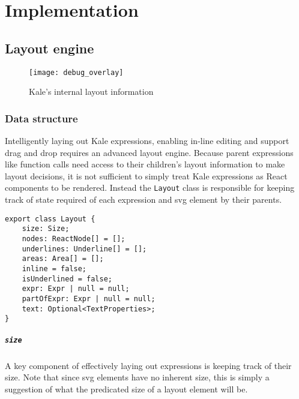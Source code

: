 \chapter{Implementation}

\section{Layout engine}

\begin{figure}[H]
\texttt{[image: debug\_overlay]}
\caption{Kale's internal layout information\protect\footnotemark}
\end{figure}

\subsection{Data structure}

Intelligently laying out Kale expressions, enabling in-line editing and
support drag and drop requires an advanced layout engine.
Because parent expressions like function calls need access to their children's
layout information to make layout decisions, it is not sufficient to simply
treat Kale expressions as React components to be rendered. Instead the
\texttt{Layout} class is responsible for keeping track of state required
of each expression and \ac{svg} element by their parents.

\begin{Verbatim}[samepage]
export class Layout {
    size: Size;
    nodes: ReactNode[] = [];
    underlines: Underline[] = [];
    areas: Area[] = [];
    inline = false;
    isUnderlined = false;
    expr: Expr | null = null;
    partOfExpr: Expr | null = null;
    text: Optional<TextProperties>;
}
\end{Verbatim}

\newcommand{\field}[1]{\paragraph{\texttt{#1}}}
\field{size} A key component of effectively laying out expressions is
keeping track of their size. Note that since \ac{svg} elements have no
inherent size, this is simply a suggestion of what the predicated size
of a layout element will be.

